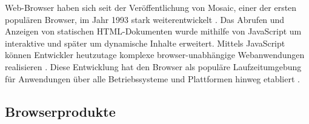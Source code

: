 Web-Browser haben sich seit der Veröffentlichung von Mosaic, einer der ersten populären Browser, im Jahr 1993 stark weiterentwickelt \cite{EvolutionOfTheWebBrowser}. Das Abrufen und Anzeigen von statischen HTML-Dokumenten wurde mithilfe von JavaScript um interaktive und später um dynamische Inhalte erweitert. Mittels JavaScript können Entwickler heutzutage komplexe browser-unabhängige Webanwendungen realisieren \cite{SinglePageApplication}. Diese Entwicklung hat den Browser als populäre Laufzeitumgebung für Anwendungen über alle Betriebssysteme und Plattformen hinweg etabliert \cite{TheWebAsAnApplicationPlatform}.

\subsection{Browserprodukte}
\label{sec:browserprodukte}


